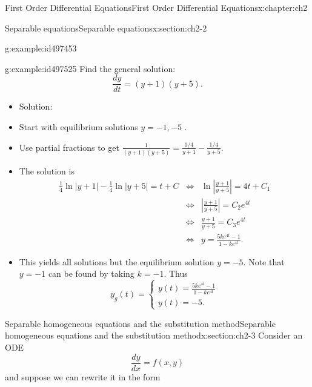 \documentclass[oneside,10pt,]{book}
\numberwithin{equation}{section}
\numberwithin{equation}{section}
\newcommand{\amp}{&}
\begin{document}
\begin{chapterptx}{First Order Differential Equations}{}{First Order Differential Equations}{}{}{x:chapter:ch2}
\begin{sectionptx}{Separable equations}{}{Separable equations}{}{}{x:section:ch2-2}
\begin{example}{}{g:example:id497453}
\end{example}
\begin{example}{}{g:example:id497525}%
Find the general solution:%
\begin{equation*}
\frac{dy}{dt}=\left(y+1\right)\left(y+5\right).
\end{equation*}
%
%
\begin{itemize}[label=\textbullet]
\item{}Solution:%
\item{}Start with equilibrium solutions \(y=-1,-5\) .%
\item{}Use partial fractions to get \(\frac{1}{\left(y+1\right)\left(y+5\right)}=\frac{1/4}{y+1}-\frac{1/4}{y+5}\).%
\item{}The solution is%
\begin{align*}
\frac{1}{4}\ln\left|y+1\right|-\frac{1}{4}\ln\left|y+5\right|=t+C \amp \iff \amp \ln\left|\frac{y+1}{y+5}\right|=4t+C_{1}\\
\amp \iff \amp \left|\frac{y+1}{y+5}\right|=C_{2}e^{4t}\\
\amp \iff \amp \frac{y+1}{y+5}=C_{3}e^{4t}\\
\amp \iff \amp y=\frac{5ke^{4t}-1}{1-ke^{4t}}.
\end{align*}
%
\item{}This yields all solutions but the equilibrium solution \(y=-5\). Note that \(y=-1\) can be found by taking \(k=-1\). Thus%
\begin{equation*}
y_g(t) =  \begin{cases}
y(t)=\frac{5ke^{4t}-1}{1-ke^{4t}}\\
y(t)=-5.
\end{cases}
\end{equation*}
%
\end{itemize}
\end{example}
\end{sectionptx}
%
%
\typeout{************************************************}
\typeout{************************************************}
%
\begin{sectionptx}{Separable homogeneous equations and the substitution method}{}{Separable homogeneous equations and the substitution method}{}{}{x:section:ch2-3}
Consider an ODE%
\begin{equation*}
\frac{dy}{dx}=f\left(x,y\right)
\end{equation*}
and suppose we can rewrite it in the form%
\begin{equation}

\end{equation}
\end{sectionptx}
\end{chapterptx}
\end{document}
